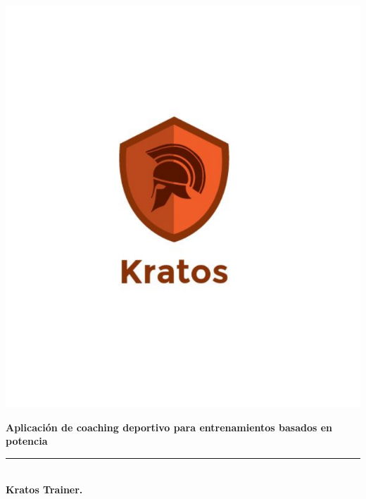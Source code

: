 \begin{titlepage}


\setlength{\centeroffset}{-0.5\oddsidemargin}
\addtolength{\centeroffset}{0.5\evensidemargin}
\thispagestyle{empty}

\noindent\hspace*{\centeroffset}\begin{minipage}{\textwidth}

\centering

%

 \vspace{3.3cm}

\includegraphics[scale=0.3]{imagenes/logo.png}
 \vspace{0.5cm}


{\semiHuge\bfseries Aplicación de coaching deportivo para entrenamientos basados en potencia\\
}
\noindent\rule[-1ex]{\textwidth}{3pt}\\[3.5ex]
{\large\bfseries Kratos Trainer.\\[4cm]}
\end{minipage}


\end{titlepage}
